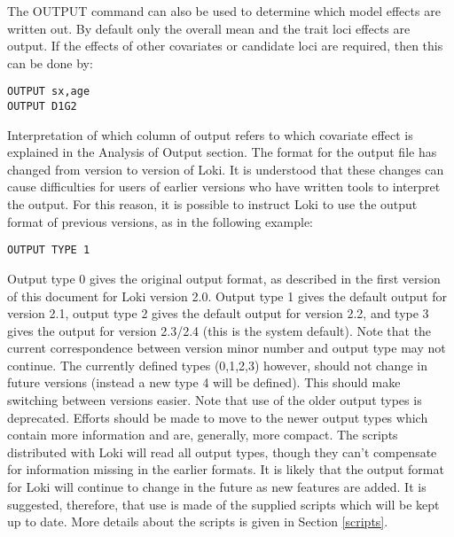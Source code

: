 \documentclass[10pt,a4paper]{article}
\begin{document}
The OUTPUT command can also be used to determine which model effects are
written out.  By default only the overall mean and the trait loci effects
are output.  If the effects of other covariates or candidate loci are
required, then this can be done by:
\begin{verbatim}
OUTPUT sx,age
OUTPUT D1G2
\end{verbatim}
Interpretation of which column of output refers to which covariate effect is
explained in the Analysis of Output section.  The format for the output file
has changed from version to version of Loki.  It is understood that these
changes can cause difficulties for users of earlier versions who have
written tools to interpret the output.  For this reason, it is possible to
instruct Loki to use the output format of previous versions, as in the
following example:
\begin{verbatim}
OUTPUT TYPE 1
\end{verbatim}
Output type 0 gives the original output format, as described in the first
version of this document for Loki version 2.0. Output type 1 gives the
default output for version 2.1, output type 2 gives the default output for
version 2.2, and type 3 gives the output for version 2.3/2.4 (this is the system
default).  Note that the current correspondence between version minor number
and output type may not continue.  The currently defined types (0,1,2,3)
however, should not change in future versions (instead a new type 4 will be
defined).  This should make switching between versions easier.  Note that
use of the older output types is deprecated.  Efforts should be made to move
to the newer output types which contain more information and are, generally,
more compact.  The scripts distributed with Loki will read all output types,
though they can't compensate for information missing in the earlier formats.
It is likely that the output format for Loki will continue to change in the
future as new features are added.  It is suggested, therefore, that use is
made of the supplied scripts which will be kept up to date.  More details
about the scripts is given in Section \ref{scripts}.
\end{document}
